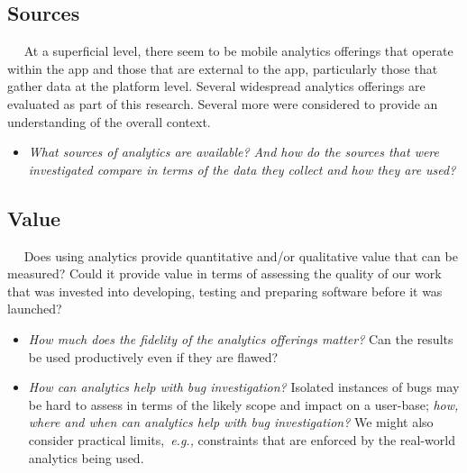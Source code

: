 \subsection{Sources}~\label{section-sources}~\label{sec:sources}
At a superficial level, there seem to be mobile analytics offerings that operate within the app and those that are external to the app, particularly those that gather data at the platform level. Several widespread analytics offerings are evaluated as part of this research. Several more were considered to provide an understanding of the overall context.
\begin{itemize}
    \item \emph{What sources of analytics are available? And how do the sources that were investigated compare in terms of the data they collect and how they are used?}
\end{itemize}

\subsection{Value}~\label{section-value}~\label{sec:value}
Does using analytics provide quantitative and/or qualitative value that can be measured? Could it provide value in terms of assessing the quality of our work that was invested into developing, testing and preparing software before it was launched?
\begin{itemize}
    \item \emph{How much does the fidelity of the analytics offerings matter?} Can the results be used productively even if they are flawed? %

    \item \emph{How can analytics help with bug investigation?} Isolated instances of bugs may be hard to assess in terms of the likely scope and impact on a user-base; \emph{how, where and when can analytics help with bug investigation?} We might also consider practical limits,~\emph{e.g.,} constraints that are enforced by the real-world analytics being used.
\end{itemize}

